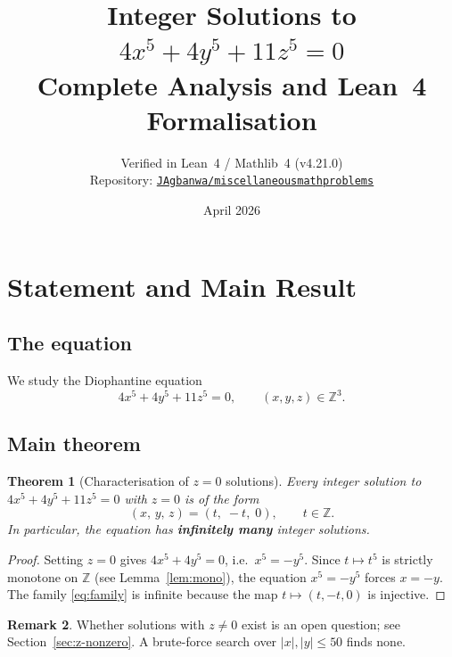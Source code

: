 \documentclass[12pt,a4paper]{article}
\title{%
  \Large\bfseries Integer Solutions to\\[6pt]
  \Huge $4x^5 + 4y^5 + 11z^5 = 0$\\[10pt]
  \large Complete Analysis and Lean~4 Formalisation
}
\author{%
  \normalsize Verified in Lean~4 / Mathlib~4 (v4.21.0)\\[2pt]
  \normalsize Repository: \href{https://github.com/JAgbanwa/miscellaneousmathproblems}%
    {\texttt{JAgbanwa/miscellaneousmathproblems}}
}
\date{\normalsize April 2026}
\newtheorem{theorem}{Theorem}[section]
\theoremstyle{definition}
\newtheorem{remark}[theorem]{Remark}
\newcommand{\Z}{\mathbb{Z}}
\begin{document}
\maketitle
\tableofcontents
\newpage

\section{Statement and Main Result}\label{sec:intro}

\subsection{The equation}

We study the Diophantine equation
\begin{equation}\label{eq:main}
  4x^5 + 4y^5 + 11z^5 = 0, \qquad (x,y,z)\in\Z^3. \tag{$\star$}
\end{equation}

\subsection{Main theorem}

\begin{theorem}[Characterisation of $z=0$ solutions]\label{thm:main}
  Every integer solution to $4x^5 + 4y^5 + 11z^5 = 0$ with $z = 0$ is of the form
  \begin{equation}\label{eq:family}
    (x,\, y,\, z) = (t,\; -t,\; 0), \qquad t \in \Z.
  \end{equation}
  In particular, the equation has \textbf{infinitely many} integer solutions.
\end{theorem}

\begin{proof}
  Setting $z = 0$ gives $4x^5 + 4y^5 = 0$, i.e.\ $x^5 = -y^5$.  Since $t \mapsto t^5$
  is strictly monotone on $\Z$ (see Lemma~\ref{lem:mono}), the equation $x^5 = -y^5$
  forces $x = -y$.  The family \eqref{eq:family} is infinite because the map
  $t \mapsto (t,-t,0)$ is injective.
\end{proof}

\begin{remark}\label{rem:z-nonzero}
  Whether solutions with $z \neq 0$ exist is an open question; see
  Section~\ref{sec:z-nonzero}.  A brute-force search over $|x|,|y| \leq 50$ finds
  none.
\end{remark}
\end{document}

